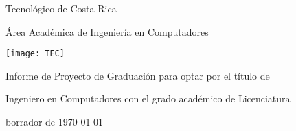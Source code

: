 
\thispagestyle{empty} 

\begin{center}

Tecnológico de Costa Rica

\par\vspace{1ex}

Área Académica de Ingeniería en Computadores

\par\vspace{20mm}

\texttt{[image: TEC]}

\par\vspace*{\fill}

{\large\bf{\scriptTitle}}

\par\vspace*{\fill}

Informe de Proyecto de Graduación para optar por el título de

Ingeniero en Computadores con el grado académico de Licenciatura

\par\vspace{20mm}

\scriptAuthor

\vspace*{\fill}

borrador de \today

\end{center}
\newpage 
\cleardoublepage 



